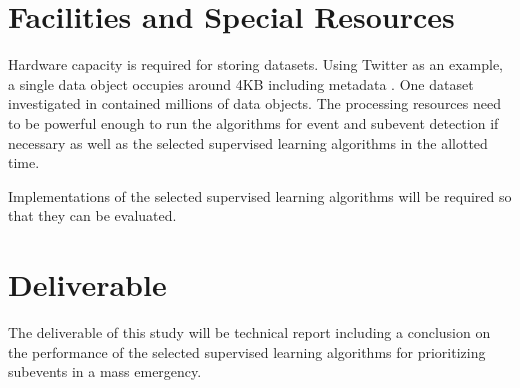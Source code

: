 \documentclass[conference]{IEEEtran}
\begin{document}
\section{Facilities and Special Resources}
Hardware capacity is required for storing datasets. Using Twitter as an example, a single data object occupies around 4KB including metadata \cite{Imran}. One dataset investigated in \cite{vieweg2014} contained millions of data objects. The processing resources need to be powerful enough to run the algorithms for event and subevent detection if necessary as well as the selected supervised learning algorithms in the allotted time.

Implementations of the selected supervised learning algorithms will be required so that they can be evaluated.


\section{Deliverable}
The deliverable of this study will be technical report including a conclusion on the performance of the selected supervised learning algorithms for prioritizing subevents in a mass emergency.









\end{document}
